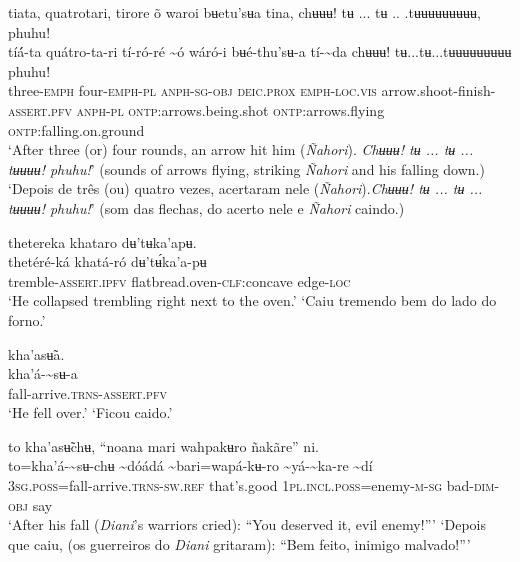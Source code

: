 \documentclass[output=paper,
modfonts,nonflat
]{langsci/langscibook}
\begin{document}
\ea tiata, quatrotari, tirore õ waroi bʉetu'sʉa tina, chʉʉʉ! tʉ ... tʉ .. .tʉʉʉʉʉʉʉʉʉ, phuhu! \\[.3em]
\gll tíá́-ta	quátro-ta-ri	tí-ró-ré	{\textasciitilde}ó	wáró-i	bʉé-thu'sʉ-a	tí-{\textasciitilde}da chʉʉʉ! tʉ...tʉ...tʉʉʉʉʉʉʉʉʉ	phuhu!\\
     three-\textsc{emph}	four-\textsc{emph-pl}	\textsc{anph-sg-obj}	\textsc{deic.prox}	\textsc{emph-loc.vis}	arrow.shoot-finish-\textsc{assert.pfv}	\textsc{anph-pl} \textsc{ontp:}arrows.being.shot \textsc{ontp:}arrows.flying	\textsc{ontp:}falling.on.ground \\
\glt ‘After three (or) four rounds, an arrow hit him (\textit{Ñahori}). \textit{Chʉʉʉ! tʉ ... tʉ ... tʉʉʉʉ! phuhu!}’ (sounds of arrows flying, striking \textit{Ñahori} and his falling down.)
\glt ‘Depois de três (ou) quatro vezes, acertaram nele (\textit{Ñahori}).\textit{Chʉʉʉ! tʉ ... tʉ ... tʉʉʉʉ! phuhu!}’ (som das flechas, do acerto nele e \textit{Ñahori} caindo.)
\z 

\ea thetereka khataro dʉ'tʉka'apʉ. \\[.3em]
\gll thetéré-ká	khatá-ró	dʉ'tʉ́ka'a-pʉ \\
     tremble-\textsc{assert.ipfv}	flatbread.oven-\textsc{clf:}concave	edge-\textsc{loc} \\
\glt ‘He collapsed trembling right next to the oven.’
\glt ‘Caiu tremendo bem do lado do forno.’
\z 

\ea kha'asʉ̃a.  \\[.3em]
\gll kha'á-{\textasciitilde}sʉ-a \\
     fall-arrive\textsc{.trns-assert.pfv} \\
\glt ‘He fell over.’
\glt ‘Ficou caido.’
\z 

\largerpage[2]
\ea to kha'asʉ̃chʉ, “noana mari wahpakʉro ñakãre” ni. \\[.3em]
\gll to=kha'á-{\textasciitilde}sʉ-chʉ	{\textasciitilde}dóádá	{\textasciitilde}bari=wapá-kʉ-ro	{\textasciitilde}yá-{\textasciitilde}ka-re	{\textasciitilde}dí \\
     3\textsc{sg.poss}=fall-arrive.\textsc{trns-sw.ref}	that's.good	1\textsc{pl.incl.poss}=enemy\textsc{-m-sg}	bad-\textsc{dim-obj}	say \\
\glt ‘After his fall{\footnotemark} (\textit{Diani}'s warriors cried): “You deserved it, evil enemy!”’
\glt ‘Depois que caiu, (os guerreiros do \textit{Diani} gritaram): “Bem feito, inimigo malvado!”’
\z
\end{document}
